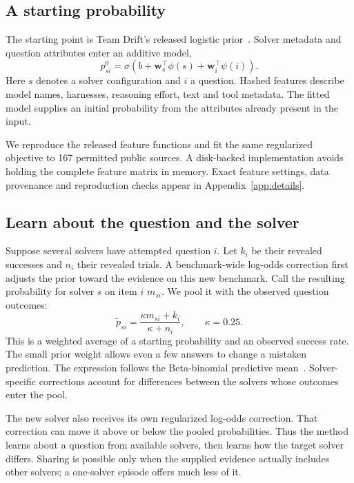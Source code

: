 \documentclass{article}
\begin{document}
\subsection{A starting probability}
The starting point is Team Drift's released logistic prior~\cite{drift}. Solver metadata and question attributes enter an additive model,
\begin{equation}
p^0_{si}=\sigma\!\left(b+\mathbf w_s^\top\phi(s)+\mathbf w_i^\top\psi(i)\right).
\end{equation}
Here $s$ denotes a solver configuration and $i$ a question. Hashed features describe model names, harnesses, reasoning effort, text and tool metadata. The fitted model supplies an initial probability from the attributes already present in the input.

We reproduce the released feature functions and fit the same regularized objective to 167 permitted public sources. A disk-backed implementation avoids holding the complete feature matrix in memory. Exact feature settings, data provenance and reproduction checks appear in Appendix~\ref{app:details}.

\subsection{Learn about the question and the solver}
Suppose several solvers have attempted question $i$. Let $k_i$ be their revealed successes and $n_i$ their revealed trials. A benchmark-wide log-odds correction first adjusts the prior toward the evidence on this new benchmark. Call the resulting probability for solver $s$ on item $i$ $m_{si}$. We pool it with the observed question outcomes:
\begin{equation}
\widetilde p_{si}=\frac{\kappa m_{si}+k_i}{\kappa+n_i},\qquad\kappa=0.25.
\label{eq:pool-main}
\end{equation}
This is a weighted average of a starting probability and an observed success rate. The small prior weight allows even a few answers to change a mistaken prediction. The expression follows the Beta-binomial predictive mean~\cite{beta}. Solver-specific corrections account for differences between the solvers whose outcomes enter the pool.

The new solver also receives its own regularized log-odds correction. That correction can move it above or below the pooled probabilities. Thus the method learns about a question from available solvers, then learns how the target solver differs. Sharing is possible only when the supplied evidence actually includes other solvers; a one-solver episode offers much less of it.
\end{document}
